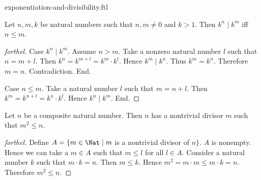 \documentclass{naproche-library}
\begin{document}
\begin{smodule}[title=Exponentiation and Divisibility]{exponentiation-and-divisibility.ftl}

\begin{proposition}[forthel,id=ARITHMETIC_13_8426075493236736]
  Let $n, m, k$ be natural numbers such that $n, m \neq 0$ and $k > 1$.
  Then $k^{n} \mid k^{m}$ iff $n \leq m$.
\end{proposition}
\begin{proof}[forthel]
  Case $k^{n} \mid k^{m}$.
    Assume $n > m$.
    Take a nonzero natural number $l$ such that $n = m + l$.
    Then $k^{n}
      = k^{m + l}
      = k^{m} \cdot k^{l}$.
    Hence $k^{m} \mid k^{n}$.
    Thus $k^{m} = k^{n}$.
    Therefore $m = n$.
    Contradiction.
  End.

  Case $n \leq m$.
    Take a natural number $l$ such that $m = n + l$.
    Then $k^{m}
      = k^{n + l}
      = k^{n} \cdot k^{l}$.
    Hence $k^{n} \mid k^{m}$.
  End.
\end{proof}

\begin{proposition}[forthel,id=ARITHMETIC_13_797196163219456]
  Let $n$ be a composite natural number.
  Then $n$ has a nontrivial divisor $m$ such that $m^{2} \leq n$.
\end{proposition}
\begin{proof}[forthel]
  Define $A = \{ m \in \Nat \mid m$ is a nontrivial divisor of $n \}$.
  $A$ is nonempty.
  Hence we can take a $m \in A$ such that $m \leq l$ for all $l \in A$.
  Consider a natural number $k$ such that $m \cdot k = n$.
  Then $m \leq k$.
  Hence $m^{2} = m \cdot m \leq m \cdot k = n$.
  Therefore $m^{2} \leq n$.
\end{proof}
\end{smodule}
\end{document}
